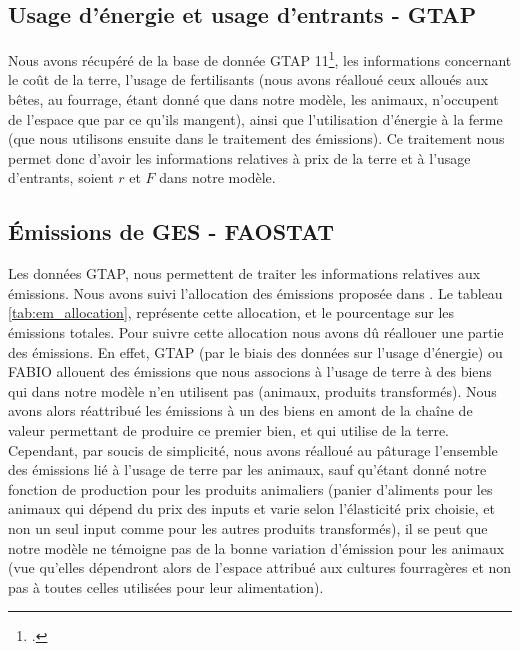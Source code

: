\subsection{Usage d'énergie et usage d'entrants - GTAP}

Nous avons récupéré de la base de donnée GTAP 11\footcite{Aguiar2022}, les informations concernant le coût de la terre, l'usage de fertilisants (nous avons réalloué ceux alloués aux bêtes, au fourrage, étant donné que dans notre modèle, les animaux, n'occupent de l'espace que par ce qu'ils mangent), ainsi que l'utilisation d'énergie à la ferme (que nous utilisons ensuite dans le traitement des émissions). Ce traitement nous permet donc d'avoir les informations relatives à prix de la terre et à l'usage d'entrants, soient $r$ et $F$ dans notre modèle.


\subsection{Émissions de GES - FAOSTAT}

Les données GTAP, nous permettent de traiter les informations relatives aux émissions. Nous avons suivi l'allocation des émissions proposée dans \cite{Valin2023}. Le tableau \ref{tab:em_allocation}, représente cette allocation, et le pourcentage sur les émissions totales. Pour suivre cette allocation nous avons dû réallouer une partie des émissions. En effet, GTAP (par le biais des données sur l'usage d'énergie) ou FABIO allouent des émissions que nous associons à l'usage de terre à des biens qui dans notre modèle n'en utilisent pas (animaux, produits transformés). Nous avons alors réattribué les émissions à un des biens en amont de la chaîne de valeur permettant de produire ce premier bien, et qui utilise de la terre. Cependant, par soucis de simplicité, nous avons réalloué au pâturage l'ensemble des émissions lié à l'usage de terre par les animaux, sauf qu'étant donné notre fonction de production pour les produits animaliers (panier d'aliments pour les animaux qui dépend du prix des inputs et varie selon l'élasticité prix choisie, et non un seul input comme pour les autres produits transformés), il se peut que notre modèle ne témoigne pas de la bonne variation d'émission pour les animaux (vue qu'elles dépendront alors de l'espace attribué aux cultures fourragères et non pas à toutes celles utilisées pour leur alimentation).

